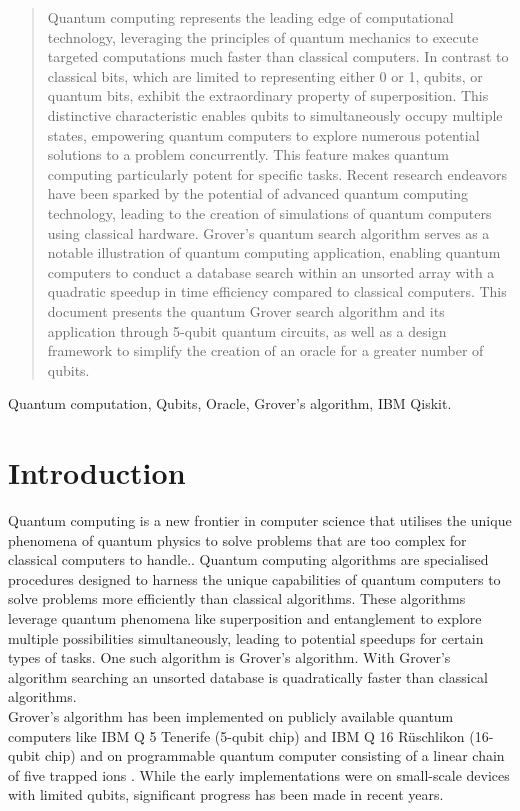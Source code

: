 \documentclass[conference]{IEEEtran}
\begin{document}
\begin{abstract}
	Quantum computing represents the leading edge of
	computational technology, leveraging the principles of quantum
	mechanics to execute targeted computations much faster than
	classical computers. In contrast to classical bits, which are limited
	to representing either 0 or 1, qubits, or quantum bits, exhibit
	the extraordinary property of superposition. This distinctive
	characteristic enables qubits to simultaneously occupy multiple
	states, empowering quantum computers to explore numerous
	potential solutions to a problem concurrently. This feature
	makes quantum computing particularly potent for specific tasks.
	Recent research endeavors have been sparked by the potential
	of advanced quantum computing technology, leading to the
	creation of simulations of quantum computers using classical
	hardware. Grover’s quantum search algorithm serves as a notable
	illustration of quantum computing application, enabling quantum
	computers to conduct a database search within an unsorted array
	with a quadratic speedup in time efficiency compared to classical
	computers. This document presents the quantum Grover search
	algorithm and its application through 5-qubit quantum circuits,
	as well as a design framework to simplify the creation of an
	oracle for a greater number of qubits.
\end{abstract}

\begin{IEEEkeywords}
	Quantum computation, Qubits, Oracle, Grover’s
	algorithm, IBM Qiskit.
\end{IEEEkeywords}

\section{Introduction}
Quantum computing is a new frontier in computer science that utilises the unique phenomena of quantum physics to solve problems that are too complex for classical computers to handle.\cite{b0}. Quantum computing algorithms are specialised procedures designed to harness the unique capabilities of quantum computers to solve problems more efficiently than classical algorithms. These algorithms leverage quantum phenomena like superposition and entanglement to explore multiple possibilities simultaneously, leading to potential speedups for certain types of tasks. One such algorithm is Grover's algorithm\cite{b1}. With Grover's algorithm searching an unsorted database is quadratically faster than classical algorithms.
\\
Grover's algorithm has been implemented on publicly available quantum computers like IBM Q 5 Tenerife (5-qubit chip) and IBM Q 16 Rüschlikon (16-qubit chip) \cite{b2} and on programmable quantum computer consisting of a
linear chain of five trapped ions \cite{b3} . While the early implementations were on small-scale devices with limited qubits, significant progress has been made in recent years.
\end{document}
